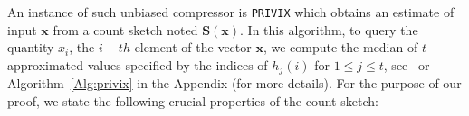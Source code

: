 \documentclass{article}
\newtheorem{property}{Property}
\begin{document}
An instance of such unbiased compressor is \texttt{PRIVIX} which obtains an estimate of input $\boldsymbol{x}$ from a count sketch noted $\boldsymbol{S}(\boldsymbol{x})$. 
In this algorithm, to query the quantity $x_i$, the $i-th$ element of the vector $\boldsymbol{x}$, we compute the median of $t$ approximated values specified by the indices of $h_j(i)$ for $1\leq j\leq t$, see~\citep{li2019privacy} or Algorithm~\ref{Alg:privix} in the Appendix (for more details).
For the purpose of our proof, we state the following crucial properties of the count sketch:
\end{document}
